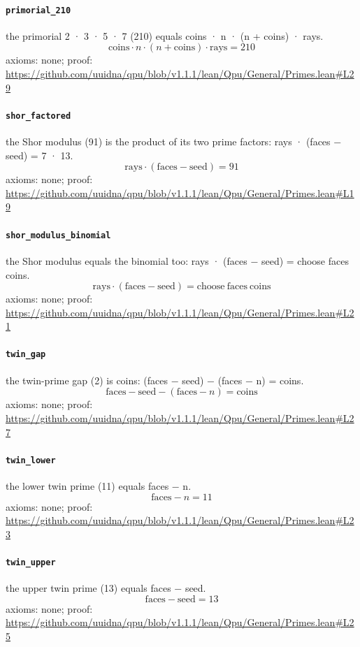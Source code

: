 \documentclass[11pt]{article}
\begin{document}
\paragraph{\texttt{primorial\_210}}
the primorial 2 · 3 · 5 · 7 (210) equals coins · n · (n + coins) · rays.
\[ \mathrm{coins} \cdot n \cdot (n + \mathrm{coins}) \cdot \mathrm{rays} = 210 \]
\noindent axioms: none; proof: \url{https://github.com/uuidna/qpu/blob/v1.1.1/lean/Qpu/General/Primes.lean\#L29}

\paragraph{\texttt{shor\_factored}}
the Shor modulus (91) is the product of its two prime factors: rays · (faces − seed) = 7 · 13.
\[ \mathrm{rays} \cdot (\mathrm{faces} - \mathrm{seed}) = 91 \]
\noindent axioms: none; proof: \url{https://github.com/uuidna/qpu/blob/v1.1.1/lean/Qpu/General/Primes.lean\#L19}

\paragraph{\texttt{shor\_modulus\_binomial}}
the Shor modulus equals the binomial too: rays · (faces − seed) = choose faces coins.
\[ \mathrm{rays} \cdot (\mathrm{faces} - \mathrm{seed}) = \mathrm{choose}\ \mathrm{faces}\ \mathrm{coins} \]
\noindent axioms: none; proof: \url{https://github.com/uuidna/qpu/blob/v1.1.1/lean/Qpu/General/Primes.lean\#L21}

\paragraph{\texttt{twin\_gap}}
the twin-prime gap (2) is coins: (faces − seed) − (faces − n) = coins.
\[ \mathrm{faces} - \mathrm{seed} - (\mathrm{faces} - n) = \mathrm{coins} \]
\noindent axioms: none; proof: \url{https://github.com/uuidna/qpu/blob/v1.1.1/lean/Qpu/General/Primes.lean\#L27}

\paragraph{\texttt{twin\_lower}}
the lower twin prime (11) equals faces − n.
\[ \mathrm{faces} - n = 11 \]
\noindent axioms: none; proof: \url{https://github.com/uuidna/qpu/blob/v1.1.1/lean/Qpu/General/Primes.lean\#L23}

\paragraph{\texttt{twin\_upper}}
the upper twin prime (13) equals faces − seed.
\[ \mathrm{faces} - \mathrm{seed} = 13 \]
\noindent axioms: none; proof: \url{https://github.com/uuidna/qpu/blob/v1.1.1/lean/Qpu/General/Primes.lean\#L25}
\end{document}
